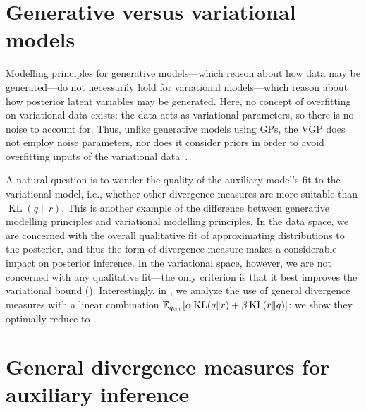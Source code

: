\section{Generative versus variational models}

Modelling principles for generative models---which reason
about how data may be generated---do not necessarily hold for
variational models---which reason about how posterior latent variables
may be generated.
Here, no concept of overfitting on variational data exists: the data
acts as variational parameters, so there is no noise to account for.
Thus, unlike generative models using \glspl{GP}, the \gls{VGP} does
not employ noise parameters, nor does it consider priors in order to
avoid overfitting inputs of the variational
data~\citep{lawrence2005probabilistic,titsias2010bayesian}.

A natural question is to wonder the quality of the auxiliary model's
fit to the variational model, i.e., whether other divergence measures
are more suitable than $\operatorname{KL}(q\|r)$. This is another
example of the difference between generative modelling principles and
variational modelling principles. In the data space, we are concerned
with the overall qualitative fit of approximating distributions to the
posterior, and thus the form of divergence measure makes a
considerable impact on posterior inference. In the variational space,
however, we are not concerned with any qualitative fit---the only
criterion is that it best improves the variational bound
(). Interestingly, in
, we analyze the use of general divergence
measures with a linear combination $\mathbb{E}_{q_{\textsc{vgp}}}[\alpha
\operatorname{KL}(q\|r) + \beta\operatorname{KL}(r\|q)]$: we show they
optimally reduce to .

\section{General divergence measures for auxiliary inference}
\label{appendix:general}

